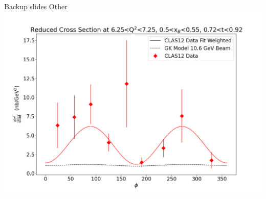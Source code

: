 \documentclass[aspectratio=169]{beamer}
\begin{document}
\begin{frame}{Backup slides}
\centering
Other\\

    \includegraphics[scale=0.2832]{DNP/finalfig2.png}\\
\end{frame}
\end{document}

